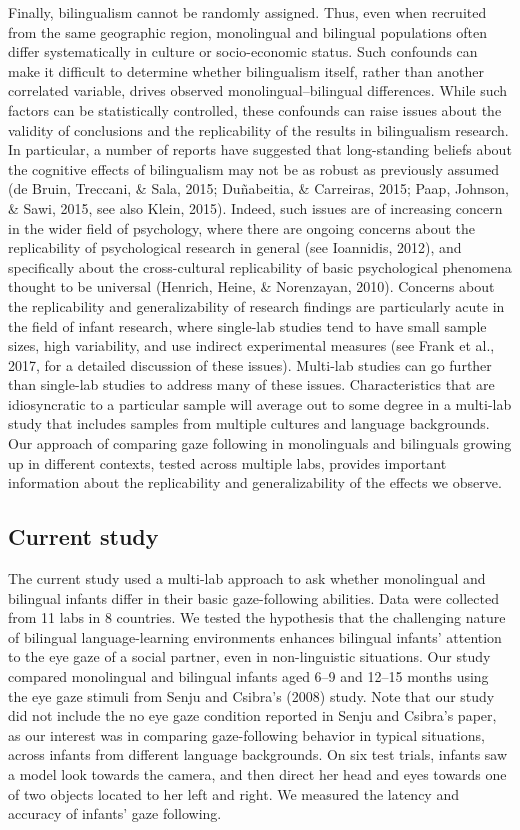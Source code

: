 \documentclass[,man,floatsintext]{apa6}
\begin{document}
Finally, bilingualism cannot be randomly assigned. Thus, even when recruited from the same geographic region, monolingual and bilingual populations often differ systematically in culture or socio-economic status. Such confounds can make it difficult to determine whether bilingualism itself, rather than another correlated variable, drives observed monolingual--bilingual differences. While such factors can be statistically controlled, these confounds can raise issues about the validity of conclusions and the replicability of the results in bilingualism research. In particular, a number of reports have suggested that long-standing beliefs about the cognitive effects of bilingualism may not be as robust as previously assumed (de Bruin, Treccani, \& Sala, 2015; Duñabeitia, \& Carreiras, 2015; Paap, Johnson, \& Sawi, 2015, see also Klein, 2015). Indeed, such issues are of increasing concern in the wider field of psychology, where there are ongoing concerns about the replicability of psychological research in general (see Ioannidis, 2012), and specifically about the cross-cultural replicability of basic psychological phenomena thought to be universal (Henrich, Heine, \& Norenzayan, 2010). Concerns about the replicability and generalizability of research findings are particularly acute in the field of infant research, where single-lab studies tend to have small sample sizes, high variability, and use indirect experimental measures (see Frank et al., 2017, for a detailed discussion of these issues). Multi-lab studies can go further than single-lab studies to address many of these issues. Characteristics that are idiosyncratic to a particular sample will average out to some degree in a multi-lab study that includes samples from multiple cultures and language backgrounds. Our approach of comparing gaze following in monolinguals and bilinguals growing up in different contexts, tested across multiple labs, provides important information about the replicability and generalizability of the effects we observe.

\hypertarget{current-study}{%
\subsection{Current study}\label{current-study}}

The current study used a multi-lab approach to ask whether monolingual and bilingual infants differ in their basic gaze-following abilities. Data were collected from 11 labs in 8 countries. We tested the hypothesis that the challenging nature of bilingual language-learning environments enhances bilingual infants' attention to the eye gaze of a social partner, even in non-linguistic situations. Our study compared monolingual and bilingual infants aged 6--9 and 12--15 months using the eye gaze stimuli from Senju and Csibra's (2008) study. Note that our study did not include the no eye gaze condition reported in Senju and Csibra's paper, as our interest was in comparing gaze-following behavior in typical situations, across infants from different language backgrounds. On six test trials, infants saw a model look towards the camera, and then direct her head and eyes towards one of two objects located to her left and right. We measured the latency and accuracy of infants' gaze following.
\end{document}
